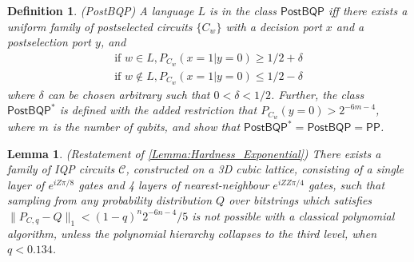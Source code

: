\documentclass[a4paper,onecolumn,11pt,accepted=2017-05-09]{quantumarticle}
\newcommand{\PP}{\textsf{PP}}
\newcommand{\PostBQP}{\textsf{PostBQP}}
\newtheorem{definition}[theorem]{Definition}
\newtheorem{lemma}[theorem]{Lemma}
\begin{document}
	
	
	
	\begin{definition}(PostBQP)
		A language $L$ is in the class $\PostBQP$ iff there exists a uniform family of postselected circuits $\{C_w\}$ with a decision port $x$ and a postselection port $y$, and 
		\begin{align}
			\text{if } w\in L, P_{C_w}(x=1|y=0) \geq 1/2 + \delta\\
			\text{if } w \not\in L, P_{C_w}(x=1|y=0) \leq 1/2 - \delta
		\end{align} 
		where $\delta$ can be chosen arbitrary such that $0 < \delta < 1/2$. Further, the class $\PostBQP^*$ is defined with the added restriction that $P_{C_w}(y = 0) > 2^{-6m-4}$, where $m$ is the number of qubits, and \cite{fujii2016computational} show that $\PostBQP^* = \PostBQP = \PP$.
	\end{definition}
	
	
	\begin{lemma} \label{Lemma:InverseExponential} (Restatement of \cref{Lemma:Hardness_Exponential})
		There exists a family of IQP circuits $\mathcal{C}$, constructed on a 3D cubic lattice, consisting of a single layer of $e^{iZ\pi/8}$ gates and 4 layers of nearest-neighbour $e^{iZZ\pi/4}$ gates, such that sampling from any probability distribution $Q$ over bitstrings which satisfies $\|P_{C,q}-Q\|_{1} < (1-q)^n2^{-6n-4}/5$ is not possible with a classical polynomial algorithm, unless the polynomial hierarchy collapses to the third level, when $q < 0.134$.
	\end{lemma}
 
\end{document}
